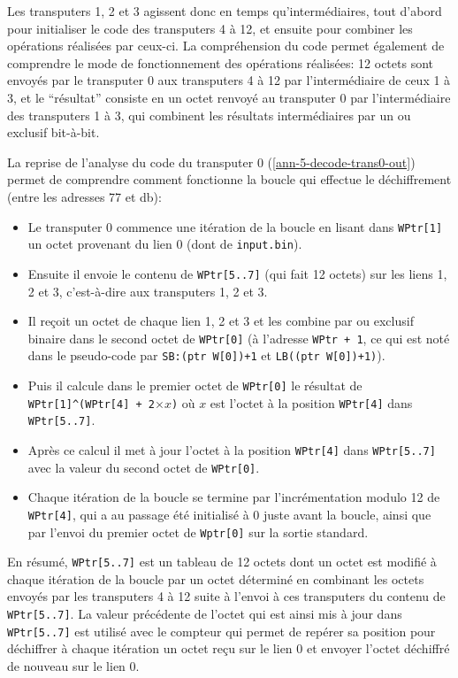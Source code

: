 \documentclass[a4paper,10pt]{article}
\begin{document}
Les transputers 1, 2 et 3 agissent donc en temps qu'intermédiaires, tout d'abord pour initialiser le code des transputers 4 à 12, et ensuite pour combiner les opérations réalisées par ceux-ci.
La compréhension du code permet également de comprendre le mode de fonctionnement des opérations réalisées: 12 octets sont envoyés par le transputer 0 aux transputers 4 à 12 par l'intermédiaire de ceux 1 à 3, et le ``résultat'' consiste en un octet renvoyé au transputer 0 par l'intermédiaire des transputers 1 à 3, qui combinent les résultats intermédiaires par un ou exclusif bit-à-bit.

La reprise de l'analyse du code du transputer 0 (\ref{ann-5-decode-trans0-out}) permet de comprendre comment fonctionne la boucle qui effectue le déchiffrement (entre les adresses 77 et db):
\begin{itemize}
  \item Le transputer 0 commence une itération de la boucle en lisant dans \texttt{WPtr[1]} un octet provenant du lien 0 (dont de \texttt{input.bin}).
  \item Ensuite il envoie le contenu de \texttt{WPtr[5..7]} (qui fait 12 octets) sur les liens 1, 2 et 3, c'est-à-dire aux transputers 1, 2 et 3.
  \item Il reçoit un octet de chaque lien 1, 2 et 3 et les combine par ou exclusif binaire dans le second octet de \texttt{WPtr[0]} (à l'adresse \texttt{WPtr + 1}, ce qui est noté dans le pseudo-code par \texttt{SB:(ptr W[0])+1} et \texttt{LB((ptr W[0])+1)}).
  \item Puis il calcule dans le premier octet de \texttt{WPtr[0]} le résultat de \texttt{WPtr[1]\^{}(WPtr[4] + 2$\times x$)} où $x$ est l'octet à la position \texttt{WPtr[4]} dans \texttt{WPtr[5..7]}.
  \item Après ce calcul il met à jour l'octet à la position \texttt{WPtr[4]} dans \texttt{WPtr[5..7]} avec la valeur du second octet de \texttt{WPtr[0]}.
  \item Chaque itération de la boucle se termine par l'incrémentation modulo 12 de \texttt{WPtr[4]}, qui a au passage été initialisé à 0 juste avant la boucle, ainsi que par l'envoi du premier octet de \texttt{Wptr[0]} sur la sortie standard.
\end{itemize}

En résumé, \texttt{WPtr[5..7]} est un tableau de 12 octets dont un octet est modifié à chaque itération de la boucle par un octet déterminé en combinant les octets envoyés par les transputers 4 à 12 suite à l'envoi à ces transputers du contenu de \texttt{WPtr[5..7]}.
La valeur précédente de l'octet qui est ainsi mis à jour dans \texttt{WPtr[5..7]} est utilisé avec le compteur qui permet de repérer sa position pour déchiffrer à chaque itération un octet reçu sur le lien 0 et envoyer l'octet déchiffré de nouveau sur le lien 0.
\end{document}
